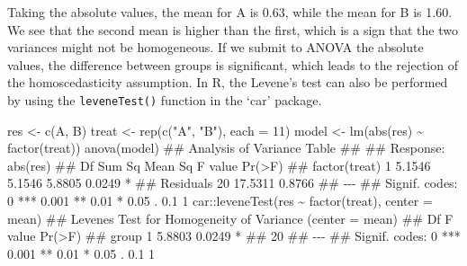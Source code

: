 \documentclass[a4paper,12pt,oneside]{book}
\newenvironment{Shaded}{\begin{snugshade}}{\end{snugshade}}
\newcommand{\DecValTok}[1]{#1}
\newcommand{\SpecialCharTok}[1]{#1}
\newcommand{\StringTok}[1]{#1}
\newcommand{\DocumentationTok}[1]{#1}
\newcommand{\OtherTok}[1]{#1}
\newcommand{\FunctionTok}[1]{#1}
\newcommand{\AttributeTok}[1]{#1}
\newcommand{\NormalTok}[1]{#1}
\begin{document}
Taking the absolute values, the mean for A is 0.63, while the mean for B is 1.60. We see that the second mean is higher than the first, which is a sign that the two variances might not be homogeneous. If we submit to ANOVA the absolute values, the difference between groups is significant, which leads to the rejection of the homoscedasticity assumption. In R, the Levene's test can also be performed by using the \texttt{leveneTest()} function in the `car' package.

\begin{Shaded}
\begin{Highlighting}[]
\NormalTok{res }\OtherTok{\textless{}{-}} \FunctionTok{c}\NormalTok{(A, B)}
\NormalTok{treat }\OtherTok{\textless{}{-}} \FunctionTok{rep}\NormalTok{(}\FunctionTok{c}\NormalTok{(}\StringTok{"A"}\NormalTok{, }\StringTok{"B"}\NormalTok{), }\AttributeTok{each =} \DecValTok{11}\NormalTok{)}
\NormalTok{model }\OtherTok{\textless{}{-}} \FunctionTok{lm}\NormalTok{(}\FunctionTok{abs}\NormalTok{(res) }\SpecialCharTok{\textasciitilde{}} \FunctionTok{factor}\NormalTok{(treat))}
\FunctionTok{anova}\NormalTok{(model)}
\DocumentationTok{\#\# Analysis of Variance Table}
\DocumentationTok{\#\# }
\DocumentationTok{\#\# Response: abs(res)}
\DocumentationTok{\#\#               Df  Sum Sq Mean Sq F value Pr(\textgreater{}F)  }
\DocumentationTok{\#\# factor(treat)  1  5.1546  5.1546  5.8805 0.0249 *}
\DocumentationTok{\#\# Residuals     20 17.5311  0.8766                 }
\DocumentationTok{\#\# {-}{-}{-}}
\DocumentationTok{\#\# Signif. codes:  0 \textquotesingle{}***\textquotesingle{} 0.001 \textquotesingle{}**\textquotesingle{} 0.01 \textquotesingle{}*\textquotesingle{} 0.05 \textquotesingle{}.\textquotesingle{} 0.1 \textquotesingle{} \textquotesingle{} 1}
\NormalTok{car}\SpecialCharTok{::}\FunctionTok{leveneTest}\NormalTok{(res }\SpecialCharTok{\textasciitilde{}} \FunctionTok{factor}\NormalTok{(treat), }\AttributeTok{center =}\NormalTok{ mean)}
\DocumentationTok{\#\# Levene\textquotesingle{}s Test for Homogeneity of Variance (center = mean)}
\DocumentationTok{\#\#       Df F value Pr(\textgreater{}F)  }
\DocumentationTok{\#\# group  1  5.8803 0.0249 *}
\DocumentationTok{\#\#       20                 }
\DocumentationTok{\#\# {-}{-}{-}}
\DocumentationTok{\#\# Signif. codes:  0 \textquotesingle{}***\textquotesingle{} 0.001 \textquotesingle{}**\textquotesingle{} 0.01 \textquotesingle{}*\textquotesingle{} 0.05 \textquotesingle{}.\textquotesingle{} 0.1 \textquotesingle{} \textquotesingle{} 1}
\end{Highlighting}
\end{Shaded}
\end{document}
